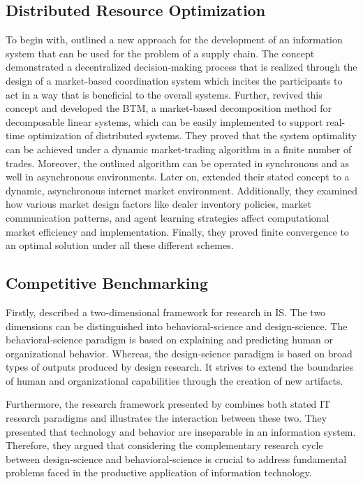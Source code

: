 \subsection{Distributed Resource Optimization}
\label{sec:Distributed Resource Optimization}
To begin with,  outlined a new approach for the 
development of an information system
that can be used for the problem of a supply chain. The concept demonstrated a decentralized
decision-making process that is realized through the design of a market-based coordination
system which incites the participants to act in a way that is beneficial to the overall
systems. Further,  revived this concept
and developed the BTM, a market-based decomposition method for decomposable linear systems,
which can be easily implemented to support real-time optimization of distributed
systems. They proved that the system optimality can be
achieved under a dynamic market-trading algorithm in a finite number of trades.
Moreover, the outlined algorithm can be operated in synchronous and as well in
asynchronous environments. Later on,  extended 
their stated concept to a dynamic, asynchronous internet market environment.
Additionally, they examined how various market design factors like dealer inventory
policies, market communication patterns, and agent learning strategies affect
computational market efficiency and implementation. Finally,
they proved finite convergence to an optimal solution under all these different schemes.

\subsection{Competitive Benchmarking}
Firstly,  described a two-dimensional framework for research in IS.
The two dimensions can be distinguished into behavioral-science and design-science. The behavioral-science
paradigm is based on explaining and predicting human or organizational behavior. Whereas, the design-science
paradigm is based on broad types of outputs produced by design research. It strives to extend the boundaries
of human and organizational capabilities through the creation of new artifacts.

Furthermore, the research framework presented by  combines both stated
IT research paradigms and illustrates the interaction between these two.
They presented that technology and behavior are inseparable in an information system. Therefore,
they argued that considering the complementary research cycle between design-science and behavioral-science
is crucial to address fundamental problems faced in the productive application of information technology.

